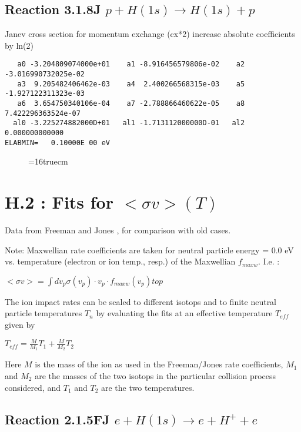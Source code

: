 \documentclass[12pt]{article}
\begin{document}
\subsection{
Reaction 3.1.8J $  p + H(1s) \rightarrow H(1s) + p  $
}
Janev cross section for momentum exchange (cx*2)
increase absolute coefficients by ln(2)

\begin{small}\begin{verbatim}
   a0 -3.204809074000e+01    a1 -8.916456579806e-02    a2 -3.016990732025e-02
   a3  9.205482406462e-03    a4  2.400266568315e-03    a5 -1.927122311323e-03
   a6  3.654750340106e-04    a7 -2.788866460622e-05    a8  7.422296363524e-07
  al0 -3.225274882000D+01   al1 -1.713112000000D-01   al2  0.000000000000
ELABMIN=   0.10000E 00 eV
\end{verbatim}\end{small}

\begin{figure} \label{318RS}
\epsfxsize=16truecm
\end{figure}
\newpage

\section{H.2 :  Fits for $<\sigma v> (T)$}\label{sect2}

\bigskip
Data from Freeman and Jones \cite{kn:Freeman},
for comparison with old cases.

Note: Maxwellian rate coefficients are taken for neutral particle energy = 0.0 eV
vs. temperature (electron or ion temp., resp.) of the Maxwellian $f_{maxw}$.
I.e. :

$<\sigma v> = \int dv_p \sigma(v_{p}) \cdot v_{p} \cdot
f_{maxw}(v_{p})top$

The ion impact rates can be scaled to different isotops and to finite
neutral particle temperatures $T_n$ by evaluating the fits at an
effective temperature $T_{eff}$ given by

$T_{eff} = \frac {M}{M_1} T_1 + \frac{M}{M_2} T_2 $

Here $M$ is the mass of the ion as used in the Freeman/Jones rate coefficients,
$M_1$ and $M_2$ are the masses of the two isotops in the particular collision
process considered, and $T_1$ and $T_2$ are the two temperatures.

\bigskip

\subsection{
Reaction 2.1.5FJ  $e + H (1s) \rightarrow e + H^+ + e$
}
\end{document}
